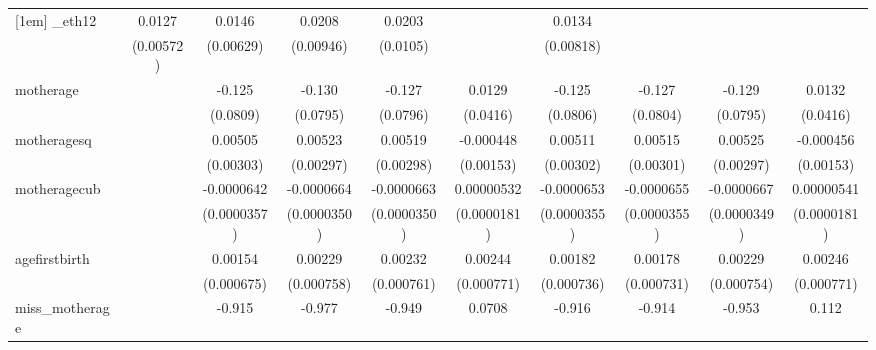 \begin{table}[htbp]
\begin{tabular}{l*{9}{c}}
[1em]
\_eth12      &      0.0127\sym{**} &      0.0146\sym{**} &      0.0208\sym{**} &      0.0203\sym{*}  &                     &      0.0134         &                     &                     &                     \\
            &   (0.00572)         &   (0.00629)         &   (0.00946)         &    (0.0105)         &                     &   (0.00818)         &                     &                     &                     \\
[1em]
motherage   &                     &      -0.125         &      -0.130         &      -0.127         &      0.0129         &      -0.125         &      -0.127         &      -0.129         &      0.0132         \\
            &                     &    (0.0809)         &    (0.0795)         &    (0.0796)         &    (0.0416)         &    (0.0806)         &    (0.0804)         &    (0.0795)         &    (0.0416)         \\
[1em]
motheragesq &                     &     0.00505\sym{*}  &     0.00523\sym{*}  &     0.00519\sym{*}  &   -0.000448         &     0.00511\sym{*}  &     0.00515\sym{*}  &     0.00525\sym{*}  &   -0.000456         \\
            &                     &   (0.00303)         &   (0.00297)         &   (0.00298)         &   (0.00153)         &   (0.00302)         &   (0.00301)         &   (0.00297)         &   (0.00153)         \\
[1em]
motheragecub&                     &  -0.0000642\sym{*}  &  -0.0000664\sym{*}  &  -0.0000663\sym{*}  &  0.00000532         &  -0.0000653\sym{*}  &  -0.0000655\sym{*}  &  -0.0000667\sym{*}  &  0.00000541         \\
            &                     & (0.0000357)         & (0.0000350)         & (0.0000350)         & (0.0000181)         & (0.0000355)         & (0.0000355)         & (0.0000349)         & (0.0000181)         \\
[1em]
agefirstbirth&                     &     0.00154\sym{**} &     0.00229\sym{***}&     0.00232\sym{***}&     0.00244\sym{***}&     0.00182\sym{**} &     0.00178\sym{**} &     0.00229\sym{***}&     0.00246\sym{***}\\
            &                     &  (0.000675)         &  (0.000758)         &  (0.000761)         &  (0.000771)         &  (0.000736)         &  (0.000731)         &  (0.000754)         &  (0.000771)         \\
[1em]
miss\_motherage&                     &      -0.915         &      -0.977         &      -0.949         &      0.0708         &      -0.916         &      -0.914         &      -0.953         &       0.112         \\

\end{tabular}
\end{table}
